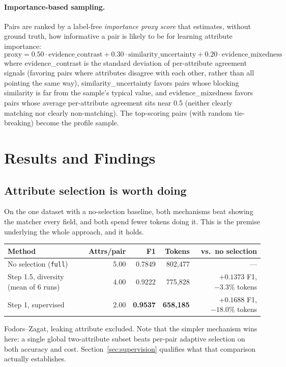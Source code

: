 \documentclass[11pt]{article}
\begin{document}
\paragraph{Importance-based sampling.} Pairs are ranked by a label-free
\emph{importance proxy score} that estimates, without ground truth, how
informative a pair is likely to be for learning attribute importance:
$$\text{proxy} = 0.50 \cdot \text{evidence\_contrast} + 0.30 \cdot \text{similarity\_uncertainty} + 0.20 \cdot \text{evidence\_mixedness}$$
%
where evidence\_contrast is the standard deviation of per-attribute agreement
signals (favoring pairs where attributes disagree with each other, rather than all
pointing the same way), similarity\_uncertainty favors pairs whose blocking
similarity is far from the sample's typical value, and evidence\_mixedness favors
pairs whose average per-attribute agreement sits near 0.5 (neither clearly matching
nor clearly non-matching). The top-scoring pairs (with random tie-breaking) become
the profile sample.

\section{Results and Findings}
\label{sec:results}

\subsection{Attribute selection is worth doing}

On the one dataset with a no-selection baseline, both mechanisms beat showing the
matcher every field, and both spend fewer tokens doing it. This is the premise
underlying the whole approach, and it holds.

\begin{center}
\small
\begin{tabular}{lrrrr}
\toprule
Method & Attrs/pair & F1 & Tokens & vs.\ no selection \\
\midrule
No selection (\texttt{full}) & 5.00 & 0.7849 & 802{,}477 & --- \\
Step 1.5, diversity (mean of 6 runs) & 4.00 & 0.9222 & 775{,}828 & $+0.1373$ F1, $-3.3\%$ tokens \\
Step 1, supervised & 2.00 & \textbf{0.9537} & \textbf{658{,}185} & $+0.1688$ F1, $-18.0\%$ tokens \\
\bottomrule
\end{tabular}
\end{center}

\noindent Fodors--Zagat, leaking attribute excluded. Note that the simpler mechanism
wins here: a single global two-attribute subset beats per-pair adaptive selection on
both accuracy and cost. Section~\ref{sec:supervision} qualifies what that comparison
actually establishes.
\end{document}
